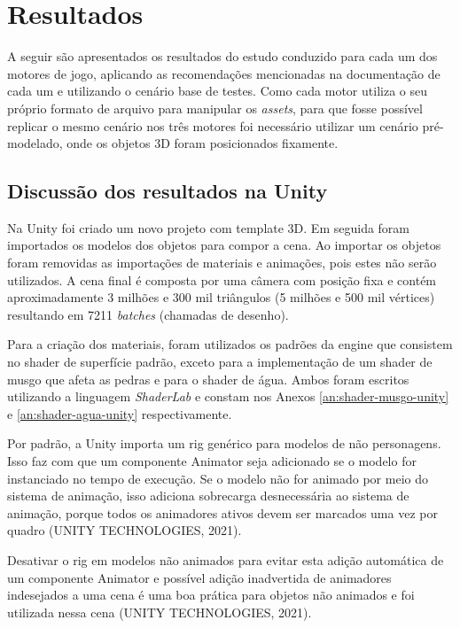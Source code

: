 \chapter{Resultados}
\label{chap:resultados}

A seguir são apresentados os resultados do estudo conduzido para cada um dos motores de jogo, aplicando as recomendações mencionadas na documentação de cada um e utilizando o cenário base de testes. Como cada motor utiliza o seu próprio formato de arquivo para manipular os \textit{assets}, para que fosse possível replicar o mesmo cenário nos três motores foi necessário utilizar um cenário pré-modelado, onde os objetos 3D foram posicionados fixamente.

\section{Discussão dos resultados na Unity}
\label{sec:resultado-unity}

Na Unity foi criado um novo projeto com template 3D. Em seguida foram importados os modelos dos objetos para compor a cena. Ao importar os objetos foram removidas as importações de materiais e animações, pois estes não serão utilizados. A cena final é composta por uma câmera com posição fixa e contém aproximadamente 3 milhões e 300 mil triângulos (5 milhões e 500 mil vértices) resultando em 7211 \textit{batches} (chamadas de desenho).

Para a criação dos materiais, foram utilizados os padrões da engine que consistem no shader de superfície padrão, exceto para a implementação de um shader de musgo que afeta as pedras e para o shader de água. Ambos foram escritos utilizando a linguagem \textit{ShaderLab} e constam nos Anexos \ref{an:shader-musgo-unity} e \ref{an:shader-agua-unity} respectivamente.

Por padrão, a Unity importa um rig genérico para modelos de não personagens. Isso faz com que um componente Animator seja adicionado se o modelo for instanciado no tempo de execução. Se o modelo não for animado por meio do sistema de animação, isso adiciona sobrecarga desnecessária ao sistema de animação, porque todos os animadores ativos devem ser marcados uma vez por quadro (UNITY TECHNOLOGIES, 2021)\nocite{unityTech2021}.

Desativar o rig em modelos não animados para evitar esta adição automática de um componente Animator e possível adição inadvertida de animadores indesejados a uma cena é uma boa prática para objetos não animados e foi utilizada nessa cena (UNITY TECHNOLOGIES, 2021). 


